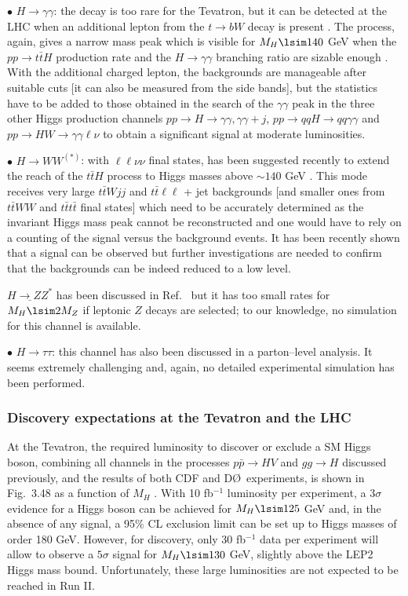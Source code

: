 $\bullet$ \underline{$H \to \gamma \gamma$}: the decay is too rare for the
Tevatron, but it can be detected at the LHC when an additional lepton from the
$t \to bW$ decay is present \cite{pp-Htt-gamma}. The process, again, gives a
narrow mass  peak which is visible for $M_H \lsim 140$ GeV when the $pp \to t
\bar tH$ production rate and the $H\to \gamma \gamma$ branching ratio are
sizable enough \cite{pp-Htt-gamma}. With the additional charged lepton, the
backgrounds are manageable \cite{pp-Htt-gamma1} after suitable cuts [it can
also be measured from the side bands], but the statistics have to be added to
those obtained in the search of the $\gamma \gamma$ peak in the three other
Higgs production channels $pp \to H\to\gamma \gamma, \gamma \gamma+j$, $pp\to
qqH \to qq \gamma \gamma$ and  $pp\to HW \to \gamma \gamma \ell \nu$ to obtain
a significant signal at moderate luminosities.\s 

$\bullet$ \underline{$H \to WW^{(*)}$}: with $\ell \ell \nu \nu$ final states,
has been suggested recently to extend the reach of the $t \bar tH$ process to
Higgs masses above $\sim 140$ GeV \cite{pp-Htt-WW}. This mode receives very
large $t \bar t Wjj$ and  $t \bar t  \ell \ell$ + jet backgrounds [and smaller
ones from $t\bar tWW$ and $t\bar t t\bar t$ final states] which need to be
accurately determined as the invariant Higgs mass peak cannot be reconstructed
and one would have to rely on a counting of the signal versus the background
events. It has been recently shown that a signal can be observed
\cite{pp-ttHWW-sim} but further investigations are needed to confirm that the
backgrounds can be indeed reduced to a low level.\s

$\underline{H \to ZZ^*}$ has been discussed in Ref.~\cite{pp-Htt-VV} but it 
has too small rates for $M_H \lsim 2M_Z$ if leptonic $Z$ decays are selected; 
to our knowledge, no simulation for this channel is available.\s

$\bullet$ \underline{$H \to \tau \tau$}: this channel has also been discussed 
\cite{pp-Htt-tau} in a parton--level analysis. It seems extremely challenging 
and, again, no detailed experimental simulation has been performed.  

\subsubsection{Discovery expectations at the Tevatron and the LHC}

At the Tevatron, the required luminosity to discover or exclude a SM Higgs
boson, combining all channels in the processes $p\bar p \to HV$ and $gg \to H$
discussed previously, and the results of both CDF and D\O\ experiments, is
shown in Fig.~3.48 as a function of $M_H$ \cite{Higgs-TeV}. With 10 fb$^{-1}$
luminosity per experiment, a 3$\sigma$ evidence for a Higgs boson can be
achieved for $M_H \lsim 125$ GeV and, in the absence of any signal, a 95\% CL
exclusion limit can be set up to Higgs masses of order 180 GeV. However, for
discovery, only 30 fb$^{-1}$ data per experiment will allow to observe a
$5\sigma$ signal for $M_H \lsim 130$ GeV, slightly above the LEP2 Higgs mass
bound. Unfortunately, these large luminosities are not expected to be reached
in Run II. \s

